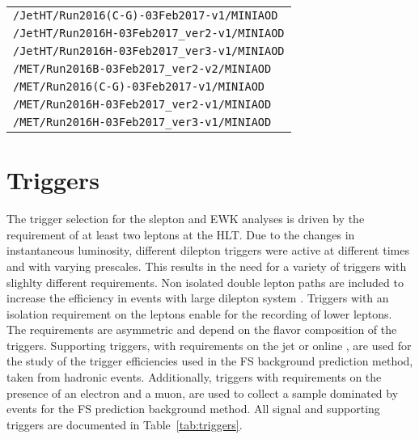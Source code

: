 \begin{table}[ht!]
\begin{center}
\begin{tabular}{ l}
        \texttt{/JetHT/Run2016(C-G)-03Feb2017-v1/MINIAOD}   \\
        \texttt{/JetHT/Run2016H-03Feb2017\_ver2-v1/MINIAOD}    \\
        \texttt{/JetHT/Run2016H-03Feb2017\_ver3-v1/MINIAOD}   \\     
        \texttt{/MET/Run2016B-03Feb2017\_ver2-v2/MINIAOD}   \\
        \texttt{/MET/Run2016(C-G)-03Feb2017-v1/MINIAOD}   \\
        \texttt{/MET/Run2016H-03Feb2017\_ver2-v1/MINIAOD}    \\
        \texttt{/MET/Run2016H-03Feb2017\_ver3-v1/MINIAOD}   \\     
        \hline
\hline\hline
\end{tabular}
\end{center}
\end{table}                                                                                  

\section{Triggers}
The trigger selection for the slepton and EWK analyses is driven by the requirement of at least two leptons at the HLT.
Due to the changes in instantaneous luminosity, different dilepton triggers were active at different times and with varying prescales. 
This results in the need for a variety of triggers with slighlty different requirements.
Non isolated double lepton paths are included to increase the efficiency in events with large dilepton system \pt. 
Triggers with an isolation requirement on the leptons enable for the recording of lower \pt leptons. 
The \pt requirements are asymmetric and depend on the flavor composition of the triggers.
Supporting triggers, with requirements on the jet \HT or online \ptmiss, are used for the study of the trigger efficiencies used in the FS background prediction method, taken from hadronic events. 
Additionally, triggers with requirements on the presence of an electron and a muon, are used to collect a sample dominated by \ttbar events for the FS prediction background method.
All signal and supporting triggers are documented in Table~\ref{tab:triggers}.                                                                                                        

